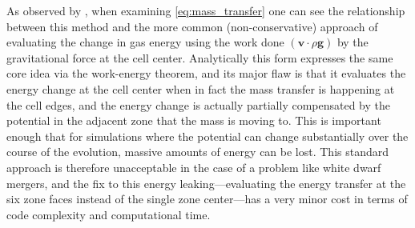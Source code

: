 \documentclass[iop]{../emulateapj}
\begin{document}
As observed by \cite{arepo}, when examining \autoref{eq:mass_transfer} one can see the relationship 
between this method and the more common (non-conservative) approach of evaluating the change in 
gas energy using the work done $(\mathbf{v} \cdot \rho \mathbf{g})$ by the gravitational force at the 
cell center. Analytically this form expresses the same core idea via the work-energy theorem, and its 
major flaw is that it evaluates the energy change at the cell center when in fact the mass transfer is 
happening at the cell edges, and the energy change is actually partially compensated by the potential 
in the adjacent zone that the mass is moving to. This is important enough that for simulations where the 
potential can change substantially over the course of the evolution, massive amounts of energy can be lost. 
This standard approach is therefore unacceptable in the case of a problem like white dwarf mergers, and 
the fix to this energy leaking---evaluating the energy transfer at the six zone faces instead of 
the single zone center---has a very minor cost in terms of code complexity and computational time.
\end{document}
